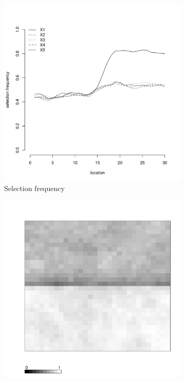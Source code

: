 \documentclass[authoryear, review, 11pt]{elsarticle}
\begin{document}
\begin{figure}
\begin{subfigure}[b]{0.45\textwidth}
		\includegraphics[width=\textwidth]{../../figures/simulation/15.21.profile_selection.pdf}
		\caption{Selection frequency}
	\end{subfigure}
	\begin{subfigure}[b]{0.45\textwidth}
	\centering
		\includegraphics[width=\textwidth]{../../figures/simulation/X1.15.21.unshrunk_bootstrap_coverage.pdf}

\end{subfigure}
\end{figure}
\end{document}
